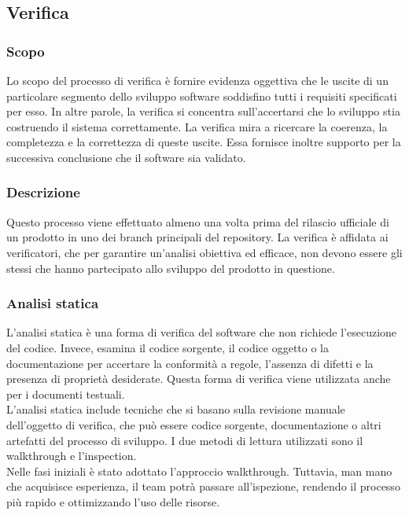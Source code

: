 \subsection{Verifica}
\subsubsection{Scopo}
Lo scopo del processo di verifica è fornire evidenza oggettiva che le uscite di un particolare segmento dello sviluppo software soddisfino tutti i requisiti specificati per esso. In altre parole, la verifica si concentra sull'accertarsi che lo sviluppo stia costruendo il sistema correttamente.
La verifica mira a ricercare la coerenza, la completezza e la correttezza di queste uscite. Essa fornisce inoltre supporto per la successiva conclusione che il software sia validato.

\subsubsection{Descrizione}
Questo processo viene effettuato almeno una volta prima del rilascio ufficiale di un prodotto in uno dei branch principali del repository. La verifica è affidata ai verificatori, che per garantire un'analisi obiettiva ed efficace, non devono essere gli stessi che hanno partecipato allo sviluppo del prodotto in questione.

\subsubsection{Analisi statica}
L'analisi statica è una forma di verifica del software che non richiede l'esecuzione del codice. Invece, esamina il codice sorgente, il codice oggetto o la documentazione per accertare la conformità a regole, l'assenza di difetti e la presenza di proprietà desiderate. Questa forma di verifica viene utilizzata anche per i documenti testuali. \\
L'analisi statica include tecniche che si basano sulla revisione manuale dell'oggetto di verifica, che può essere codice sorgente, documentazione o altri artefatti del processo di sviluppo. I due metodi di lettura utilizzati sono il walkthrough e l'inspection. \\
Nelle fasi iniziali è stato adottato l’approccio walkthrough. Tuttavia, man mano che acquisisce esperienza, il team potrà passare all’ispezione, rendendo il processo più rapido e ottimizzando l’uso delle risorse.


